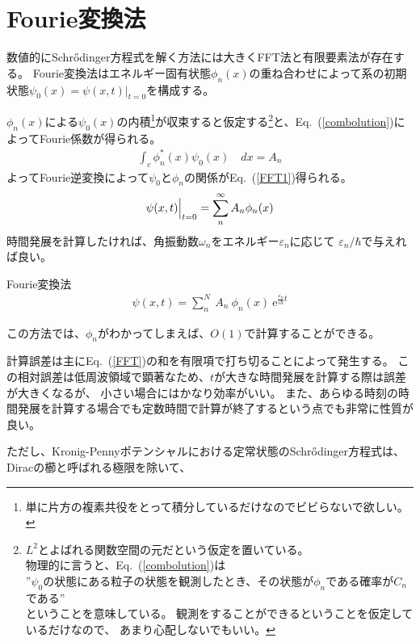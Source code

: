 \documentclass[autodetect-engine,dvipdfmx-if-dvi,ja=standard,a4paper,layout=v2]{bxjsreport}
\newcommand{\eref}[1]{Eq.~(\ref{#1})}
\begin{document}
    \section{Fourie変換法}
    数値的にSchrődinger方程式を解く方法には大きくFFT法と有限要素法が存在する。
    Fourie変換法はエネルギー固有状態$\phi_n(x)$の重ね合わせによって系の初期状態$\psi_0(x) = \psi(x, t)|_{t=0}$を構成する。\par
    $\phi_n(x)$による$\psi_0(x)$の内積\footnote{
      単に片方の複素共役をとって積分しているだけなのでビビらないで欲しい。
    }が収束すると仮定する\footnote{
      $L^2$とよばれる関数空間の元だという仮定を置いている。\\
      物理的に言うと、\eref{combolution}は\\
      ”$\psi_0$の状態にある粒子の状態を観測したとき、その状態が$\phi_n$である確率が$C_n$である”\\
      ということを意味している。
      観測をすることができるということを仮定しているだけなので、
      あまり心配しないでもいい。
    }と、\eref{combolution}によってFourie係数が得られる。
    \begin{align}
      \int_{c}\phi^*_n(x)\psi_0(x)\quad dx = A_n\label{combolution}
    \end{align}
    よってFourie逆変換によって$\psi_0$と$\phi_n$の関係が\eref{FFT1}得られる。
    \begin{align}
      \Bigl.\psi(x, t)\Bigr|_{t=0} = \sum_{n}^{\infty} A_{n} \phi_n(x)\label{FFT1}
    \end{align}
    時間発展を計算したければ、角振動数$\omega_n$をエネルギー$\varepsilon_n$に応じて
    $\varepsilon_n / \hbar$で与えれば良い。
    \begin{itembox}[l]{Fourie変換法}
    \begin{align}
      \psi(x,t)=\sum_{n}^{N}\:A_n\ \phi_n(x) \:\mathrm{e}^{\frac{\varepsilon_n}{i\hbar} t}\label{FFT}
    \end{align}
    \end{itembox}
    この方法では、$\phi_n$がわかってしまえば、$O(1)$で計算することができる。\par
    計算誤差は主に\eref{FFT}の和を有限項で打ち切ることによって発生する。
    この相対誤差は低周波領域で顕著なため、$t$が大きな時間発展を計算する際は誤差が大きくなるが、
    小さい場合にはかなり効率がいい。
    また、あらゆる時刻の時間発展を計算する場合でも定数時間で計算が終了するという点でも非常に性質が良い。\par
    ただし、Kronig-Pennyポテンシャルにおける定常状態のSchrődinger方程式は、Diracの櫛と呼ばれる極限を除いて、
\end{document}
